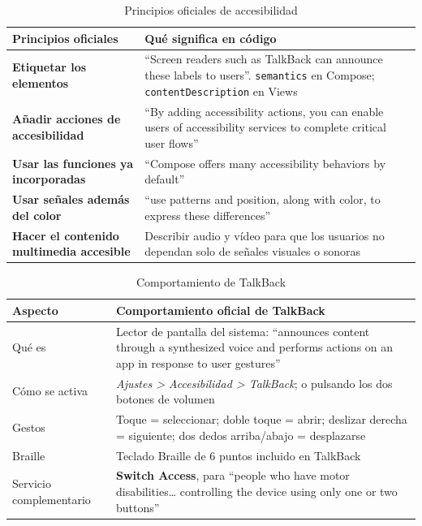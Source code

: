 \documentclass[11pt,a4paper]{article}
\newcommand{\code}[1]{\texttt{\color{ink}#1}}
\begin{document}
	\begin{table}[htbp]
		\centering
		\small
		\begin{tabularx}{\textwidth}{@{}>{\RaggedRight\arraybackslash}p{5cm} >{\RaggedRight\arraybackslash}X@{}}
			\toprule
			\rowcolor{primary}
			\textcolor{paper}{\sffamily\bfseries Principios oficiales} & \textcolor{paper}{\sffamily\bfseries Qué significa en código} \\
			\midrule
			\textbf{Etiquetar los elementos} & \enquote{Screen readers such as TalkBack can announce these labels to users}. \code{semantics} en Compose; \code{contentDescription} en Views \\
			\rowcolor{soft}
			\textbf{Añadir acciones de accesibilidad} & \enquote{By adding accessibility actions, you can enable users of accessibility services to complete critical user flows} \\
			\textbf{Usar las funciones ya incorporadas} & \enquote{Compose offers many accessibility behaviors by default} \\
			\rowcolor{soft}
			\textbf{Usar señales además del color} & \enquote{use patterns and position, along with color, to express these differences} \\
			\textbf{Hacer el contenido multimedia accesible} & Describir audio y vídeo para que los usuarios no dependan solo de señales visuales o sonoras \\
			\bottomrule
		\end{tabularx}
		\caption{Principios oficiales de accesibilidad}
	\end{table}
	
	\begin{table}[htbp]
		\centering
		\small
		\begin{tabularx}{\textwidth}{@{}>{\RaggedRight\arraybackslash}p{3cm} >{\RaggedRight\arraybackslash}X@{}}
			\toprule
			\rowcolor{primary}
			\textcolor{paper}{\sffamily\bfseries Aspecto} & \textcolor{paper}{\sffamily\bfseries Comportamiento oficial de TalkBack} \\
			\midrule
			Qué es & Lector de pantalla del sistema: \enquote{announces content through a synthesized voice and performs actions on an app in response to user gestures} \\
			\rowcolor{soft}
			Cómo se activa & \emph{Ajustes > Accesibilidad > TalkBack}; o pulsando los dos botones de volumen \\
			Gestos & Toque = seleccionar; doble toque = abrir; deslizar derecha = siguiente; dos dedos arriba/abajo = desplazarse \\
			\rowcolor{soft}
			Braille & Teclado Braille de 6 puntos incluido en TalkBack \\
			Servicio complementario & \textbf{Switch Access}, para \enquote{people who have motor disabilities\ldots{} controlling the device using only one or two buttons} \\
			\bottomrule
		\end{tabularx}
		\caption{Comportamiento de TalkBack}
	\end{table}
	
\end{document}

